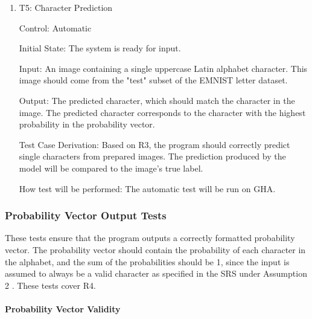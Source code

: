 \documentclass[12pt, titlepage]{article}
\begin{document}
\begin{enumerate}

\item{T5: Character Prediction\\}

Control: Automatic

Initial State: The \progname{} system is ready for input.

Input: An image containing a single uppercase Latin alphabet character. This
image should come from the "test" subset of the EMNIST letter dataset.

Output: The predicted character, which should match the character in the image.
The predicted character corresponds to the character with the highest
probability in the probability vector.

Test Case Derivation: Based on R3, the program should correctly predict single
characters from prepared images. The prediction produced by the model will be
compared to the image's true label.

How test will be performed: The automatic test will be run on GHA.

\end{enumerate}

\subsubsection{Probability Vector Output Tests}

These tests ensure that the program outputs a correctly formatted probability
vector. The probability vector should contain the probability of each character
in the alphabet, and the sum of the probabilities should be 1, since the
input is assumed to always be a valid character as specified in the SRS
under Assumption 2 \citep{SRS}. These tests cover R4.

\paragraph{Probability Vector Validity}
\end{document}
